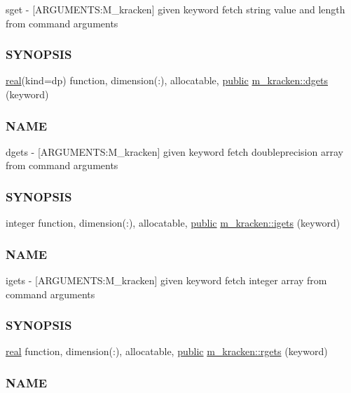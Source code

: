\begin{DoxyCompactItemize}
\begin{DoxyCompactList}
sget -\/ \mbox{[}A\+R\+G\+U\+M\+E\+N\+TS\+:M\+\_\+kracken\mbox{]} given keyword fetch string value and length from command arguments \subsubsection*{S\+Y\+N\+O\+P\+S\+IS}\end{DoxyCompactList}\item 
\hyperlink{read__watch_83_8txt_abdb62bde002f38ef75f810d3a905a823}{real}(kind=dp) function, dimension(\+:), allocatable, \hyperlink{M__stopwatch_83_8txt_a2f74811300c361e53b430611a7d1769f}{public} \hyperlink{namespacem__kracken_a76e99048e7fb6010dcb7173ef958c932}{m\+\_\+kracken\+::dgets} (keyword)
\begin{DoxyCompactList}\small\item\em \subsubsection*{N\+A\+ME}

dgets -\/ \mbox{[}A\+R\+G\+U\+M\+E\+N\+TS\+:M\+\_\+kracken\mbox{]} given keyword fetch doubleprecision array from command arguments \subsubsection*{S\+Y\+N\+O\+P\+S\+IS}\end{DoxyCompactList}\item 
integer function, dimension(\+:), allocatable, \hyperlink{M__stopwatch_83_8txt_a2f74811300c361e53b430611a7d1769f}{public} \hyperlink{namespacem__kracken_ac118bb44d855d68bfce6caa80d60e5e0}{m\+\_\+kracken\+::igets} (keyword)
\begin{DoxyCompactList}\small\item\em \subsubsection*{N\+A\+ME}

igets -\/ \mbox{[}A\+R\+G\+U\+M\+E\+N\+TS\+:M\+\_\+kracken\mbox{]} given keyword fetch integer array from command arguments \subsubsection*{S\+Y\+N\+O\+P\+S\+IS}\end{DoxyCompactList}\item 
\hyperlink{read__watch_83_8txt_abdb62bde002f38ef75f810d3a905a823}{real} function, dimension(\+:), allocatable, \hyperlink{M__stopwatch_83_8txt_a2f74811300c361e53b430611a7d1769f}{public} \hyperlink{namespacem__kracken_aa1a29fad1518c15d8710d273755a17cc}{m\+\_\+kracken\+::rgets} (keyword)
\begin{DoxyCompactList}\small\item\em \subsubsection*{N\+A\+ME}


\end{DoxyCompactList}
\end{DoxyCompactItemize}

